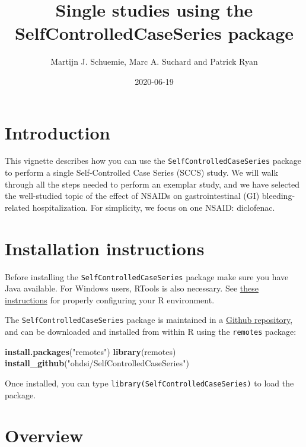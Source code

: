 \documentclass[
]{article}
\title{Single studies using the SelfControlledCaseSeries package}
\author{Martijn J. Schuemie, Marc A. Suchard and Patrick Ryan}
\date{2020-06-19}
\newenvironment{Shaded}{\begin{snugshade}}{\end{snugshade}}
\newcommand{\KeywordTok}[1]{\textcolor[rgb]{0.13,0.29,0.53}{\textbf{#1}}}
\newcommand{\NormalTok}[1]{#1}
\newcommand{\StringTok}[1]{\textcolor[rgb]{0.31,0.60,0.02}{#1}}
\begin{document}
\maketitle

{
\setcounter{tocdepth}{2}
\tableofcontents
}
\hypertarget{introduction}{%
\section{Introduction}\label{introduction}}

This vignette describes how you can use the
\texttt{SelfControlledCaseSeries} package to perform a single
Self-Controlled Case Series (SCCS) study. We will walk through all the
steps needed to perform an exemplar study, and we have selected the
well-studied topic of the effect of NSAIDs on gastrointestinal (GI)
bleeding-related hospitalization. For simplicity, we focus on one NSAID:
diclofenac.

\hypertarget{installation-instructions}{%
\section{Installation instructions}\label{installation-instructions}}

Before installing the \texttt{SelfControlledCaseSeries} package make
sure you have Java available. For Windows users, RTools is also
necessary. See \href{https://ohdsi.github.io/Hades/rSetup.html}{these
instructions} for properly configuring your R environment.

The \texttt{SelfControlledCaseSeries} package is maintained in a
\href{https://github.com/OHDSI/SelfControlledCaseSeries}{Github
repository}, and can be downloaded and installed from within R using the
\texttt{remotes} package:

\begin{Shaded}
\begin{Highlighting}[]
\KeywordTok{install.packages}\NormalTok{(}\StringTok{"remotes"}\NormalTok{)}
\KeywordTok{library}\NormalTok{(remotes)}
\KeywordTok{install_github}\NormalTok{(}\StringTok{"ohdsi/SelfControlledCaseSeries"}\NormalTok{) }
\end{Highlighting}
\end{Shaded}

Once installed, you can type \texttt{library(SelfControlledCaseSeries)}
to load the package.

\hypertarget{overview}{%
\section{Overview}\label{overview}}
\end{document}
